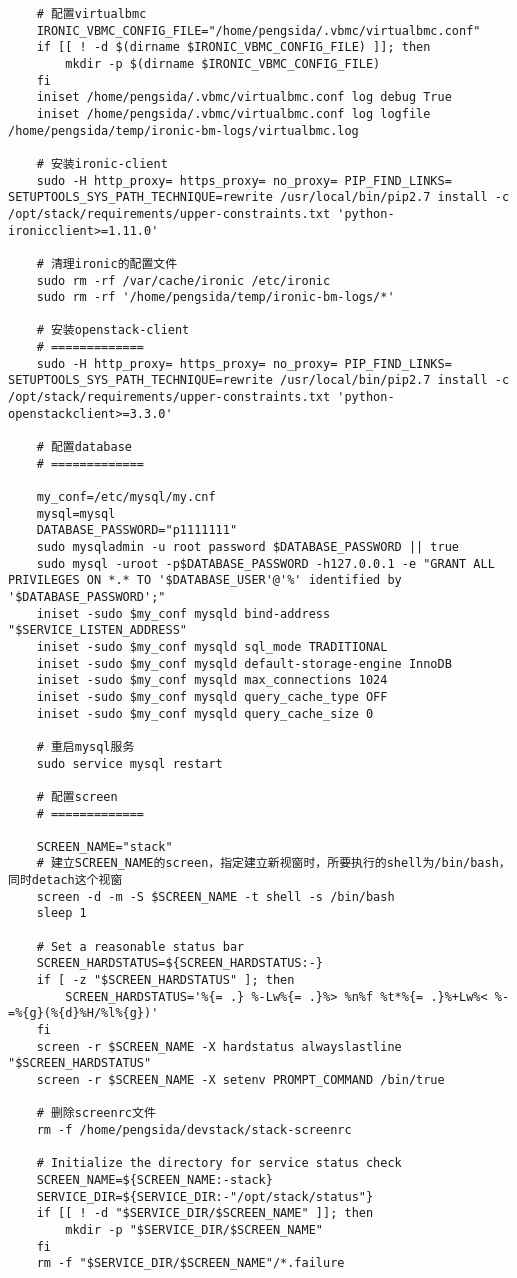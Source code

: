 \documentclass[a4paper,left=1.5cm,right=1.5cm,11pt]{article}
\begin{document}
\begin{lstlisting}
	# 配置virtualbmc
	IRONIC_VBMC_CONFIG_FILE="/home/pengsida/.vbmc/virtualbmc.conf"
	if [[ ! -d $(dirname $IRONIC_VBMC_CONFIG_FILE) ]]; then
        mkdir -p $(dirname $IRONIC_VBMC_CONFIG_FILE)
    fi
	iniset /home/pengsida/.vbmc/virtualbmc.conf log debug True
    iniset /home/pengsida/.vbmc/virtualbmc.conf log logfile /home/pengsida/temp/ironic-bm-logs/virtualbmc.log

	# 安装ironic-client
	sudo -H http_proxy= https_proxy= no_proxy= PIP_FIND_LINKS= SETUPTOOLS_SYS_PATH_TECHNIQUE=rewrite /usr/local/bin/pip2.7 install -c /opt/stack/requirements/upper-constraints.txt 'python-ironicclient>=1.11.0'

	# 清理ironic的配置文件
	sudo rm -rf /var/cache/ironic /etc/ironic
	sudo rm -rf '/home/pengsida/temp/ironic-bm-logs/*'

	# 安装openstack-client
	# =============
	sudo -H http_proxy= https_proxy= no_proxy= PIP_FIND_LINKS= SETUPTOOLS_SYS_PATH_TECHNIQUE=rewrite /usr/local/bin/pip2.7 install -c /opt/stack/requirements/upper-constraints.txt 'python-openstackclient>=3.3.0'

	# 配置database
	# =============

	my_conf=/etc/mysql/my.cnf
    mysql=mysql
	DATABASE_PASSWORD="p1111111"
	sudo mysqladmin -u root password $DATABASE_PASSWORD || true
    sudo mysql -uroot -p$DATABASE_PASSWORD -h127.0.0.1 -e "GRANT ALL PRIVILEGES ON *.* TO '$DATABASE_USER'@'%' identified by '$DATABASE_PASSWORD';"
    iniset -sudo $my_conf mysqld bind-address "$SERVICE_LISTEN_ADDRESS"
    iniset -sudo $my_conf mysqld sql_mode TRADITIONAL
    iniset -sudo $my_conf mysqld default-storage-engine InnoDB
    iniset -sudo $my_conf mysqld max_connections 1024
    iniset -sudo $my_conf mysqld query_cache_type OFF
    iniset -sudo $my_conf mysqld query_cache_size 0

	# 重启mysql服务
	sudo service mysql restart

	# 配置screen
	# =============
	
	SCREEN_NAME="stack"
	# 建立SCREEN_NAME的screen，指定建立新视窗时，所要执行的shell为/bin/bash，同时detach这个视窗
	screen -d -m -S $SCREEN_NAME -t shell -s /bin/bash
    sleep 1

    # Set a reasonable status bar
    SCREEN_HARDSTATUS=${SCREEN_HARDSTATUS:-}
    if [ -z "$SCREEN_HARDSTATUS" ]; then
        SCREEN_HARDSTATUS='%{= .} %-Lw%{= .}%> %n%f %t*%{= .}%+Lw%< %-=%{g}(%{d}%H/%l%{g})'
    fi
    screen -r $SCREEN_NAME -X hardstatus alwayslastline "$SCREEN_HARDSTATUS"
    screen -r $SCREEN_NAME -X setenv PROMPT_COMMAND /bin/true

	# 删除screenrc文件
	rm -f /home/pengsida/devstack/stack-screenrc

	# Initialize the directory for service status check
	SCREEN_NAME=${SCREEN_NAME:-stack}
    SERVICE_DIR=${SERVICE_DIR:-"/opt/stack/status"}
    if [[ ! -d "$SERVICE_DIR/$SCREEN_NAME" ]]; then
        mkdir -p "$SERVICE_DIR/$SCREEN_NAME"
    fi
    rm -f "$SERVICE_DIR/$SCREEN_NAME"/*.failure
	\end{lstlisting}
	
\end{document}
